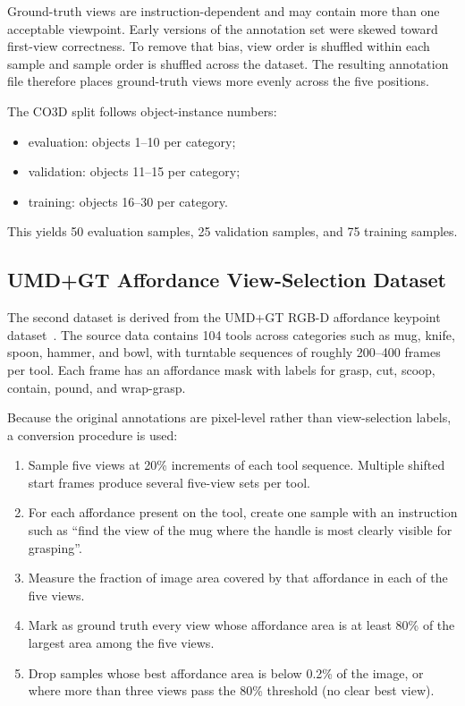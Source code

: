 Ground-truth views are instruction-dependent and may contain more than one acceptable viewpoint. Early versions of the annotation set were skewed toward first-view correctness. To remove that bias, view order is shuffled within each sample and sample order is shuffled across the dataset. The resulting annotation file therefore places ground-truth views more evenly across the five positions.

The CO3D split follows object-instance numbers:
\begin{itemize}
    \item evaluation: objects 1--10 per category;
    \item validation: objects 11--15 per category;
    \item training: objects 16--30 per category.
\end{itemize}
This yields 50 evaluation samples, 25 validation samples, and 75 training samples.

\subsection{UMD+GT Affordance View-Selection Dataset}

The second dataset is derived from the UMD+GT RGB-D affordance keypoint dataset~\cite{myers_umd_affordance}. The source data contains 104 tools across categories such as mug, knife, spoon, hammer, and bowl, with turntable sequences of roughly 200--400 frames per tool. Each frame has an affordance mask with labels for grasp, cut, scoop, contain, pound, and wrap-grasp.

Because the original annotations are pixel-level rather than view-selection labels, a conversion procedure is used:

\begin{enumerate}
    \item Sample five views at 20\% increments of each tool sequence. Multiple shifted start frames produce several five-view sets per tool.
    \item For each affordance present on the tool, create one sample with an instruction such as ``find the view of the mug where the handle is most clearly visible for grasping''.
    \item Measure the fraction of image area covered by that affordance in each of the five views.
    \item Mark as ground truth every view whose affordance area is at least 80\% of the largest area among the five views.
    \item Drop samples whose best affordance area is below 0.2\% of the image, or where more than three views pass the 80\% threshold (no clear best view).
\end{enumerate}

